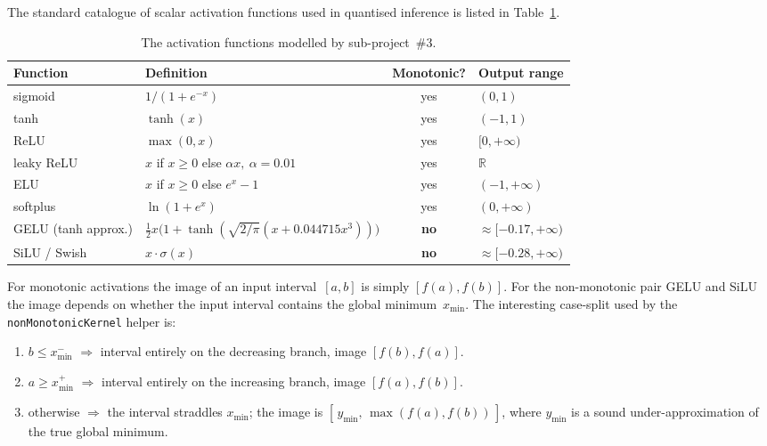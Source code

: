 \documentclass[11pt,a4paper]{article}
\theoremstyle{plain}
\begin{document}
The standard catalogue of scalar activation functions used in
quantised inference is listed in Table~\ref{tab:activations}.

\begin{table}[H]
\centering
\small
\begin{tabular}{@{}llcl@{}}
\toprule
Function & Definition & Monotonic? & Output range \\
\midrule
sigmoid    & $1/(1+e^{-x})$                                   & yes & $(0,1)$ \\
tanh       & $\tanh(x)$                                       & yes & $(-1,1)$ \\
ReLU       & $\max(0,x)$                                      & yes & $[0,+\infty)$ \\
leaky ReLU & $x$ if $x\ge0$ else $\alpha x,\ \alpha=0.01$     & yes & $\mathbb{R}$ \\
ELU        & $x$ if $x\ge0$ else $e^x-1$                      & yes & $(-1,+\infty)$ \\
softplus   & $\ln(1+e^x)$                                     & yes & $(0,+\infty)$ \\
GELU (tanh approx.) & $\tfrac{1}{2}x\big(1+\tanh(\sqrt{2/\pi}(x+0.044715x^3))\big)$ & \textbf{no} & $\approx[-0.17,+\infty)$ \\
SiLU / Swish & $x\cdot\sigma(x)$                              & \textbf{no} & $\approx[-0.28,+\infty)$ \\
\bottomrule
\end{tabular}
\caption{The activation functions modelled by sub-project~\#3.}
\label{tab:activations}
\end{table}

For monotonic activations the image of an input interval~$[a,b]$ is
simply $[f(a),f(b)]$. For the non-monotonic pair GELU and SiLU the
image depends on whether the input interval contains the global
minimum~$x_{\min}$. The interesting case-split used by the
\texttt{nonMonotonicKernel} helper is:
\begin{enumerate}
\item $b\le x^-_{\min}$ $\Longrightarrow$ interval entirely on the
      decreasing branch, image $[f(b),f(a)]$.
\item $a\ge x^+_{\min}$ $\Longrightarrow$ interval entirely on the
      increasing branch, image $[f(a),f(b)]$.
\item otherwise $\Longrightarrow$ the interval straddles $x_{\min}$;
      the image is $[\,y_{\min},\,\max(f(a),f(b))\,]$, where $y_{\min}$
      is a sound under-approximation of the true global minimum.
\end{enumerate}
\end{document}
